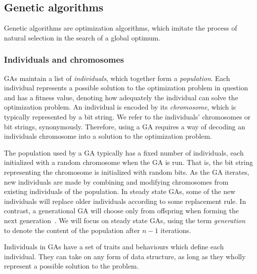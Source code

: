 \subsection{Genetic algorithms} 
Genetic algorithms are optimization algorithms, which imitate the process of natural selection in the search of a global optimum.

\subsubsection{Individuals and chromosomes}
GAs maintain a list of \emph{individuals}, which together form a \emph{population}. Each individual represents a possible solution to the optimization problem in question and has a fitness value, denoting how adequately the individual can solve the optimization problem. An individual is encoded by its \emph{chromosome}, which is typically represented by a bit string. We refer to the individuals' chromosomes or bit strings, synonymously. Therefore, using a GA requires a way of decoding an individuals chromosome into a solution to the optimization problem.

The population used by a GA typically has a fixed number of individuals, each initialized with a random chromosome when the GA is run. That is, the bit string representing the chromosome is initialized with random bits. As the GA iterates, new individuals are made by combining and modifying chromosomes from existing individuals of the population. In steady state GAs, some of the new individuals will replace older individuals according to some replacement rule. In contrast, a generational GA will choose only from offspring when forming the next generation~\cite{fogarty, Syswerda:1989:UCG:645512.657265, Whitley:1989:GAS:93126.93169}. We will focus on steady state GAs, using the term \emph{generation}  to denote the content of the population after $n - 1$ iterations.

Individuals in GAs have a set of traits and behaviours which define each individual. They can take on any form of data structure, as long as they wholly represent a possible solution to the problem. 



